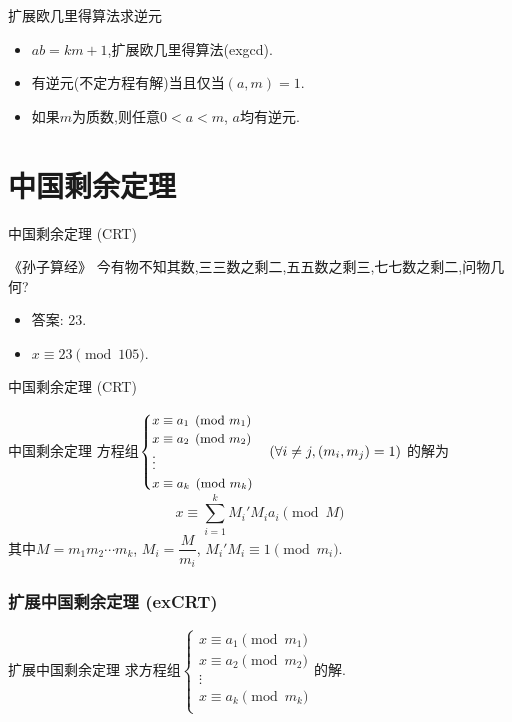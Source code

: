 \documentclass[aspectratio=169]{beamer}  %
\newcommand{\pau}{\pause}
\begin{document}
\begin{frame}[fragile]{扩展欧几里得算法求逆元}
    \begin{itemize}
        \item $ab=km+1$,扩展欧几里得算法(exgcd). \pau
        \item 有逆元(不定方程有解)当且仅当$(a,m)=1$. \pau
        \item 如果$m$为质数,则任意$0<a<m$, $a$均有逆元.
    \end{itemize}
\end{frame}

\section{中国剩余定理}
\begin{frame}[fragile]{中国剩余定理 (CRT)}
    \begin{exampleblock}{《孙子算经》}
        今有物不知其数,三三数之剩二,五五数之剩三,七七数之剩二,问物几何?
    \end{exampleblock} \pau
    \begin{itemize}
        \item 答案: $23$. \pau
        \item $x\equiv 23\pmod{105}$.
    \end{itemize}
\end{frame}

\begin{frame}[fragile]{中国剩余定理 (CRT)}
    \begin{block}{中国剩余定理}
        方程组$\small\begin{cases}
		x\equiv a_1\pmod{m_1}\\
		x\equiv a_2\pmod{m_2}\\
		\vdots\\
		x\equiv a_k\pmod{m_k}\\
		\end{cases}\left(\forall i\neq j,(m_i,m_j)=1\right)$
		的解\pau 为$$x\equiv\sum\limits_{i=1}^kM_i'M_ia_i\pmod M$$其中$M=m_1m_2\cdots m_k$, $M_i=\dfrac{M}{m_i}$, $M_i'M_i\equiv1\pmod{m_i}$.
    \end{block}
\end{frame}

\begin{frame}[fragile]
    \frametitle{扩展中国剩余定理 (exCRT)}
    \begin{block}{扩展中国剩余定理}
        求方程组$\begin{cases}
		x\equiv a_1\pmod{m_1}\\
		x\equiv a_2\pmod{m_2}\\
		\vdots\\
		x\equiv a_k\pmod{m_k}\\
		\end{cases}$的解.
    \end{block}
\end{frame}
\end{document}
